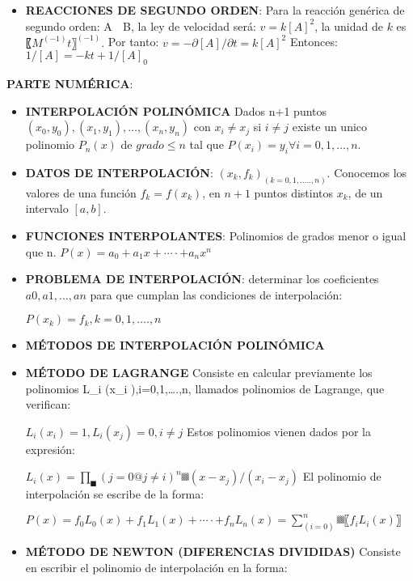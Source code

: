 \documentclass[10pt,a4paper]{article}
\begin{document}
\begin{multicols}{2}
\begin{itemize}
	\item \textbf{REACCIONES DE SEGUNDO ORDEN}: Para la reacción genérica de segundo orden: A  B, la ley de velocidad será: $v=k[A]^2$, la unidad de $k$ es 〖$M^(-1) t〗^(-1). $
	Por tanto: 
	$v=-∂[A]/∂t=k[A]^2$
	Entonces: $1/[A] =-kt+  1/[A]_0 $


\end{itemize}
\noindent \textbf{PARTE NUMÉRICA}:	
\begin{itemize}
	\item \textbf{INTERPOLACIÓN POLINÓMICA}
	Dados n+1 puntos $(x_0,y_0), (x_1,y_1), … , (x_n,y_n)$ con $x_i≠x_j$  si $i≠j$ existe un unico polinomio $P_n (x)$ de $grado ≤ n$ tal que $P(x_i )=y_i     ∀ i=0,1,…,n.$
	\item \textbf{DATOS DE INTERPOLACIÓN}: 
	${(x_k,f_k )}_(k=0,1,…..,n)$.
	Conocemos los valores de una función $f_k=f(x_k)$, en $n+1$ puntos distintos $x_k$, de un intervalo $[a,b]$.
	
	\item \textbf{FUNCIONES INTERPOLANTES}: Polinomios de grados menor o igual que n.
	$P(x)=a_0+a_1 x+⋯⋅+a_n x^n$

	\item \textbf{PROBLEMA DE INTERPOLACIÓN}: determinar los coeficientes $a0, a1,…, an$ para que cumplan las condiciones de interpolación:

	$P(x_k )= f_k,k=0,1,….,n$

	\item \textbf{MÉTODOS DE INTERPOLACIÓN POLINÓMICA}

	\item \textbf{MÉTODO DE LAGRANGE}
	Consiste en calcular previamente los polinomios  L_i (x_i ),i=0,1,….,n, llamados polinomios de Lagrange, que verifican:

	$L_i (x_i )=1,L_i (x_j )=0,i≠j$
	Estos polinomios vienen dados por la expresión:

	$L_i (x)=∏_█(j=0@j≠i)^n▒(x-x_j)/(x_i-x_j )$
	El polinomio de interpolación se escribe de la forma:
	
	$P(x)=f_0 L_0 (x)+f_1 L_1 (x)+⋯⋅+f_n L_n (x)=∑_(i=0)^n▒〖f_i L_i (x) 〗$
	
	\item \textbf{MÉTODO DE NEWTON (DIFERENCIAS DIVIDIDAS)}
	Consiste en escribir el polinomio de interpolación en la forma:
	

\end{itemize}
\end{multicols}
\end{document}
